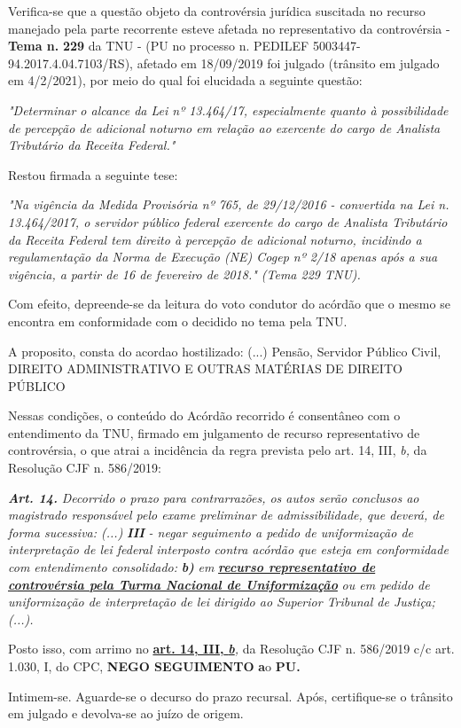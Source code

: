 \documentclass[12pt]{article}
\begin{document}
\justifying
\noindent Verifica-se que a questão objeto da controvérsia jurídica suscitada no recurso manejado pela parte recorrente esteve afetada no representativo da controvérsia - \textbf{Tema n. }\textbf{229} da TNU - (PU no processo n. PEDILEF 5003447-94.2017.4.04.7103/RS),  afetado em 18/09/2019 foi julgado (trânsito em julgado em 4/2/2021), por meio do qual foi elucidada a seguinte questão:

\noindent \textit{"Determinar o alcance da Lei nº 13.464/17, especialmente quanto à possibilidade de percepção de adicional noturno em relação ao exercente do cargo de Analista Tributário da Receita Federal."}

\noindent Restou firmada a seguinte tese:

\noindent \textit{"Na vigência da Medida Provisória nº 765, de 29/12/2016 - convertida na Lei n. 13.464/2017, o servidor público federal exercente do cargo de Analista Tributário da Receita Federal tem direito à percepção de adicional noturno, incidindo a regulamentação da Norma de Execução (NE) Cogep nº 2/18 apenas após a sua vigência, a partir de 16 de fevereiro de 2018." (Tema 229 TNU).}

\noindent Com efeito, depreende-se da leitura do voto condutor do acórdão que o mesmo se encontra em conformidade com o decidido no  tema pela TNU.

\noindent A proposito, consta do acordao hostilizado: (...) Pensão, Servidor Público Civil, DIREITO ADMINISTRATIVO E OUTRAS MATÉRIAS DE DIREITO PÚBLICO

\noindent Nessas condições, o conteúdo do Acórdão recorrido é consentâneo com o entendimento da TNU, firmado em julgamento de recurso representativo de controvérsia, o que atrai a incidência da regra prevista pelo art. 14, III, \textit{b,} da Resolução CJF n. 586/2019:

\noindent \textit{\textbf{Art. 14.}}\textit{ Decorrido o prazo para contrarrazões, os autos serão conclusos ao magistrado responsável pelo exame preliminar de admissibilidade, que deverá, de forma sucessiva: (...) }\textit{\textbf{III }}\textit{- negar seguimento a pedido de uniformização de interpretação de lei federal interposto contra acórdão que esteja em conformidade com entendimento consolidado: }\textit{\textbf{b)}}\textit{ em }\uline{\textit{\textbf{recurso representativo de controvérsia pela Turma Nacional de Uniformização}}}\textit{ ou em pedido de uniformização de interpretação de lei dirigido ao Superior Tribunal de Justiça;(...).}

\noindent Posto isso, com arrimo no \uline{\textbf{art. 14, III, }}\uline{\textit{\textbf{b}}}\textit{,} da Resolução CJF n. 586/2019 c/c art. 1.030, I, do CPC, \textbf{NEGO SEGUIMENTO }\textbf{a}o\textbf{ PU}\textbf{.}

\noindent Intimem-se. Aguarde-se o decurso do prazo recursal. Após, certifique-se o trânsito em julgado e devolva-se ao juízo de origem.
\end{document}
